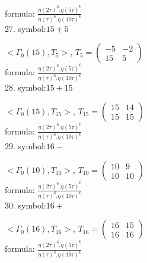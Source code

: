 formula: 
$ \frac{\eta(2\tau)^6 . \eta(5\tau)^6}{\eta(\tau)^6 . \eta(10\tau)^6} $
\\

27. symbol:$ 15+5 $

$ < \Gamma_0 ( 15 ), T_{5} >  $,
$
T_{5} = 
\left(
\begin{array}{cc}
-5 & -2 \\
15 & 5
\end{array}
\right)
$
\\

formula: 
$ \frac{\eta(2\tau)^6 . \eta(5\tau)^6}{\eta(\tau)^6 . \eta(10\tau)^6} $
\\

28. symbol:$ 15+15 $

$ < \Gamma_0 ( 15 ), T_{15} >  $,
$
T_{15} = 
\left(
\begin{array}{cc}
15 & 14 \\
15 & 15
\end{array}
\right)
$
\\

formula: 
$ \frac{\eta(2\tau)^6 . \eta(5\tau)^6}{\eta(\tau)^6 . \eta(10\tau)^6} $
\\

29. symbol:$ 16- $

$ < \Gamma_0 ( 10 ), T_{10} >  $,
$
T_{10} = 
\left(
\begin{array}{cc}
10 & 9 \\
10 & 10
\end{array}
\right)
$
\\

formula: 
$ \frac{\eta(2\tau)^6 . \eta(5\tau)^6}{\eta(\tau)^6 . \eta(10\tau)^6} $
\\

30. symbol:$ 16+ $

$ < \Gamma_0 ( 16 ), T_{16} >  $,
$
T_{16} = 
\left(
\begin{array}{cc}
16 & 15 \\
16 & 16
\end{array}
\right)
$
\\

formula: 
$ \frac{\eta(2\tau)^6 . \eta(5\tau)^6}{\eta(\tau)^6 . \eta(10\tau)^6} $
\\


